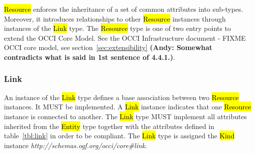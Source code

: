 \documentclass[10pt,a4paper]{article}
\begin{document}

\hl{Resource} enforces the inheritance of a set of common attributes into
sub-types. Moreover, it introduces relationships to other \hl{Resource}
instances through instances of the \hl{Link} type.
%
The \hl{Resource} type is one of two entry points to extend the OCCI Core Model.
See the OCCI Infrastructure document\cite{occi:infrastructure}
- FIXME
OCCI core model, see section~\ref{sec:extensibility} 
\textbf{(Andy: Somewhat contradicts what is said in 1st sentence of 4.4.1.)}.

\subsubsection{Link}
\label{sec:link}
An instance of the \hl{Link} type defines a base association between two
\hl{Resource} instances. It MUST be implemented. A \hl{Link} instance indicates
that one \hl{Resource} instance is connected to another.
%
The \hl{Link} type MUST implement all attributes inherited from the
\hl{Entity} type together with the attributes defined in table~\ref{tbl:link}
in order to be compliant.
%
The \hl{Link} type is assigned the \hl{Kind} instance
\textit{http://schemas.ogf.org/occi/core\#link}.

\end{document}
